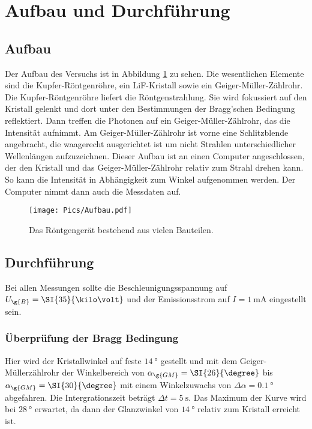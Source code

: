 \section{Aufbau und Durchführung}
\label{sec:Durchführung}

\subsection{Aufbau}
Der Aufbau des Versuchs ist in Abbildung \ref{fig:aufbau} zu sehen. Die wesentlichen
Elemente sind die Kupfer-Röntgenröhre, ein LiF-Kristall sowie ein Geiger-Müller-Zählrohr.
Die Kupfer-Röntgenröhre liefert die Röntgenstrahlung. Sie wird fokussiert auf den Kristall
gelenkt und dort unter den Bestimmungen der Bragg'schen Bedingung reflektiert. Dann
treffen die Photonen auf ein Geiger-Müller-Zählrohr, das die Intensität aufnimmt.
Am Geiger-Müller-Zählrohr ist vorne eine Schlitzblende angebracht, die waagerecht ausgerichtet
ist um nicht Strahlen unterschiedlicher Wellenlängen aufzuzeichnen.
Dieser Aufbau ist an einen Computer angeschlossen, der den Kristall und das Geiger-Müller-Zählrohr
relativ zum Strahl drehen kann. So kann die Intensität in Abhängigkeit zum Winkel
aufgenommen werden. Der Computer nimmt dann auch die Messdaten auf.

\begin{figure}
  \centering
  \texttt{[image: Pics/Aufbau.pdf]}
  \caption{Das Röntgengerät bestehend aus vielen Bauteilen. \cite{anleitung}}
  \label{fig:aufbau}
\end{figure}

\subsection{Durchführung}

Bei allen Messungen sollte die Beschleunigungsspannung auf
$U_{\g{B}} = \SI{35}{\kilo\volt}$ und der Emissionsstrom auf $I = \SI{1}{\milli\ampere}$
eingestellt sein.

\subsubsection{Überprüfung der Bragg Bedingung}

Hier wird der Kristallwinkel auf feste $\SI{14}{\degree}$ gestellt und mit dem
Geiger-Müllerzählrohr der Winkelbereich von $\alpha_{\g{GM}} = \SI{26}{\degree}$
bis $\alpha_{\g{GM}} = \SI{30}{\degree}$ mit einem Winkelzuwachs von
$\Delta \alpha = \SI{0.1}{\degree}$ abgefahren. Die Intergrationszeit beträgt
$\Delta t = \SI{5}{\second}$. Das Maximum der Kurve wird bei $\SI{28}{\degree}$
erwartet, da dann der Glanzwinkel von $\SI{14}{\degree}$ relativ zum Kristall erreicht ist.

